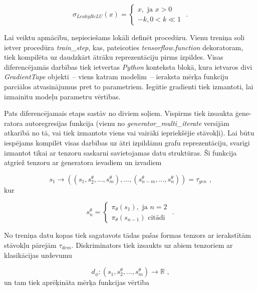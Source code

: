 \documentclass[12pt, a4paper]{article}
\numberwithin{equation}{section} %
\begin{document}
\begin{equation}
    \sigma_{LeakyReLU}(x) = 
    \begin{cases}
        x, \text{ ja } x > 0 \\
        -k, 0 < k \ll 1
    \end{cases}
\text{ .}
\end{equation}

Lai veiktu apmācību, nepieciešams lokāli definēt procedūru. Vienu treniņa soli ietver procedūra \textit{train\_step}, kas, pateicoties \textit{tensorflow.function} dekoratoram, tiek kompilēta uz daudzkārt ātrāku reprezentāciju pirms izpildes. Visas diferencējamās darbības tiek ietvertas \textit{Python} konteksta blokā, kura ietvaros divi \textit{GradientTape} objekti~-- viens katram modelim~-- ieraksta mērķa funkciju parciālos atvasinājumus pret to parametriem. Iegūtie gradienti tiek izmantoti, lai izmainītu modeļu parametru vērtības.

Pats diferencējamais etaps sastāv no diviem soļiem. Vispirms tiek izsaukta ģene-ratora autoregresijas funkcija (vienu no \textit{generator\_multi\_iterate} versijām atkarībā no tā, vai tiek izmantots viens vai vairāki iepriekšējie stāvokļi). Lai būtu iespējams kompilēt visas darbības uz ātri izpildāmu grafu reprezentāciju, svarīgi izmantot tikai ar tenzoru saskarni savietojamas datu struktūras. Šī funkcija atgriež tenzoru ar ģeneratora ievadiem un izvadiem

\begin{equation}
    s_1 \rightarrow \left ( (s_1, s^{\theta}_2 , ..., s^{\theta}_m), ...,  (s^{\theta}_{n-m}, ..., s^{\theta}_{n}) \right ) = \tau_{gen}
\text{ ,}
\end{equation}
kur

\begin{equation}
    s^{\theta}_n = 
    \begin{cases}
        \pi_{\theta}(s_1), \text{ ja } n = 2 \\
        \pi_{\theta}(s_{n-1}) \text{ citādi}
    \end{cases}
    \text{ .}
\end{equation}

No treniņa datu kopas tiek sagatavots tādas pašas formas tenzors ar ierakstītām stāvokļu pārejām $\tau_{dem}$. Diskriminators tiek izsaukts uz abiem tenzoriem ar klasikācijas uzdevumu

\begin{equation}
    d_{\phi}: (s_1, s^{\theta}_2 , ..., s^{\theta}_m) \rightarrow \mathbb{R}
    \text{ ,}
\end{equation}
un tam tiek aprēķināta mērķa funkcijas vērtība 
\end{document}
